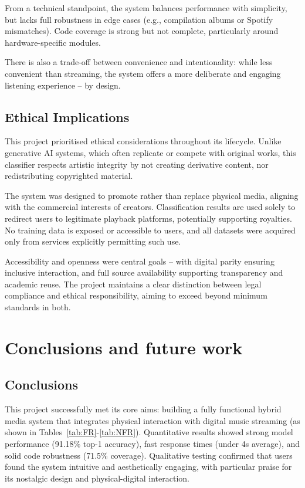             From a technical standpoint, the system balances performance with simplicity, but lacks full robustness in edge cases (e.g., compilation albums or Spotify mismatches). Code coverage is strong but not complete, particularly around hardware-specific modules.
            
            There is also a trade-off between convenience and intentionality: while less convenient than streaming, the system offers a more deliberate and engaging listening experience -- by design.
    
        \subsection{Ethical Implications}
            
            This project prioritised ethical considerations throughout its lifecycle. Unlike generative AI systems, which often replicate or compete with original works, this classifier respects artistic integrity by not creating derivative content, nor redistributing copyrighted material.
            
            The system was designed to promote rather than replace physical media, aligning with the commercial interests of creators. Classification results are used solely to redirect users to legitimate playback platforms, potentially supporting royalties. No training data is exposed or accessible to users, and all datasets were acquired only from services explicitly permitting such use.
            
            Accessibility and openness were central goals -- with digital parity ensuring inclusive interaction, and full source availability supporting transparency and academic reuse. The project maintains a clear distinction between legal compliance and ethical responsibility, aiming to exceed beyond minimum standards in both.
    
    \section{Conclusions and future work} %
        \subsection{Conclusions}
    
            This project successfully met its core aims: building a fully functional hybrid media system that integrates physical interaction with digital music streaming (as shown in Tables~\ref{tab:FR}-\ref{tab:NFR}). Quantitative results showed strong model performance (91.18\% top-1 accuracy), fast response times (under 4s average), and solid code robustness (71.5\% coverage). Qualitative testing confirmed that users found the system intuitive and aesthetically engaging, with particular praise for its nostalgic design and physical-digital interaction.
    
